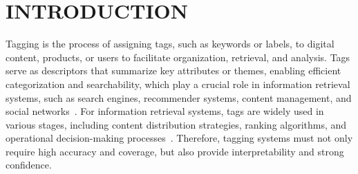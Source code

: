 
\section{INTRODUCTION}\label{sec:intro}

Tagging is the process of assigning tags, such as keywords or labels, to digital content, products, or users to facilitate organization, retrieval, and analysis. Tags serve as descriptors that summarize key attributes or themes, enabling efficient categorization and searchability, which play a crucial role in information retrieval systems, such as search engines, recommender systems, content management, and social networks~\cite{zhang2011tag,gupta2010survey,bischoff2008can,li2008tag}.
For information retrieval systems, tags are widely used in various stages, including content distribution strategies, ranking algorithms, and operational decision-making processes~\cite{dattolo2010role,ahmadian2022deep}.
Therefore, tagging systems must not only require high accuracy and coverage, but also provide interpretability and strong confidence.


